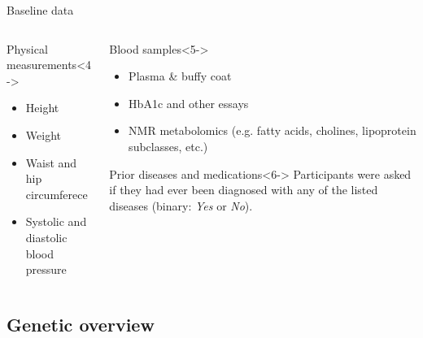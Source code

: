 \begin{frame}{Baseline data}
\begin{columns}[t]
{\begin{column}{0.3\textwidth}
            \begin{block}{Physical measurements}<4->
                \begin{itemize}
                    \item Height
                    \item Weight
                    \item Waist and hip circumferece
                    \item Systolic and diastolic blood pressure
                \end{itemize}
            \end{block}

        \end{column}

        \begin{column}{0.3\textwidth}

            \begin{block}{Blood samples}<5->
                \begin{itemize}
                    \item Plasma \& buffy coat
                    \item HbA1c and other essays
                    \item NMR metabolomics (e.g. fatty acids, cholines, lipoprotein subclasses, etc.)
                \end{itemize}
            \end{block}

            \begin{block}{Prior diseases and medications}<6->
                Participants were asked if they had ever been diagnosed with any of the listed diseases (binary: \textit{Yes} or \textit{No}).
            \end{block}

        \end{column}
        }
    \end{columns}
\end{frame}

\subsection{Genetic overview}

